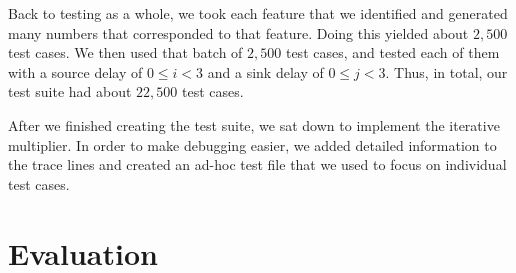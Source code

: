 \documentclass[10pt]{article}
\begin{document}
	Back to testing as a whole, we took each feature that we identified and generated many numbers that corresponded to that feature. Doing this yielded about $2,500$ test cases. We then used that batch of $2,500$ test cases, and tested each of them with a source delay of $0\leq i<3$ and a sink delay of $0\leq j<3$. Thus, in total, our test suite had about $22,500$ test cases.

	After we finished creating the test suite, we sat down to implement the iterative multiplier. In order to make debugging easier, we added detailed information to the trace lines and created an ad-hoc test file that we used to focus on individual test cases.
	
	
	\section{Evaluation}
	\label{sec:evaluation}
\end{document}
